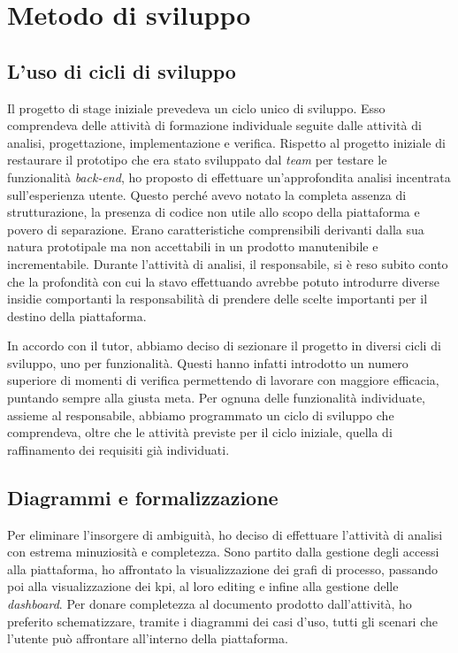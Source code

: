 \section{Metodo di sviluppo}
\subsection{L'uso di cicli di sviluppo}
Il progetto di stage iniziale prevedeva un ciclo unico di sviluppo. Esso comprendeva delle attività di formazione individuale seguite dalle attività di analisi, progettazione, implementazione e verifica.
Rispetto al progetto iniziale di restaurare il prototipo che era stato sviluppato dal \textit{team} per testare le funzionalità \textit{back-end}, ho proposto di effettuare un'approfondita analisi incentrata sull'esperienza utente. Questo perché avevo notato la completa assenza di strutturazione, la presenza di codice non utile allo scopo della piattaforma e povero di separazione. Erano caratteristiche comprensibili derivanti dalla sua natura prototipale ma non accettabili in un prodotto manutenibile e incrementabile.
Durante l'attività di analisi, il responsabile, si è reso subito conto che la profondità con cui la stavo effettuando avrebbe potuto introdurre diverse insidie comportanti la responsabilità di prendere delle scelte importanti per il destino della piattaforma.

In accordo con il tutor, abbiamo deciso di sezionare il progetto in diversi cicli di sviluppo, uno per funzionalità. Questi hanno infatti introdotto un numero superiore di momenti di verifica permettendo di lavorare con maggiore efficacia, puntando sempre alla giusta meta.
Per ognuna delle funzionalità individuate, assieme al responsabile, abbiamo programmato un ciclo di sviluppo che comprendeva, oltre che le attività previste per il ciclo iniziale, quella di raffinamento dei requisiti già individuati.

\subsection{Diagrammi e formalizzazione}
\label{ssec:diagrams}
Per eliminare l'insorgere di ambiguità, ho deciso di effettuare l'attività di analisi con estrema minuziosità e completezza.
Sono partito dalla gestione degli accessi alla piattaforma, ho affrontato la visualizzazione dei grafi di processo, passando poi alla visualizzazione dei \acrshort{kpi}, al loro editing e infine alla gestione delle \textit{dashboard}.
Per donare completezza al documento prodotto dall'attività, ho preferito schematizzare, tramite i diagrammi dei casi d'uso, tutti gli scenari che l'utente può affrontare all'interno della piattaforma.

